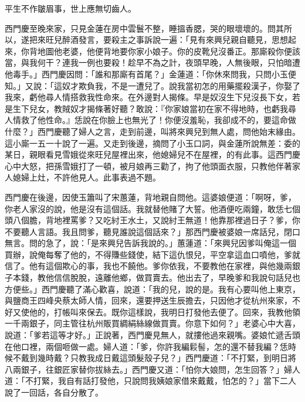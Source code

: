 平生不作皺眉事，世上應無切齒人。

西門慶至晚來家，只見金蓮在房中雲鬟不整，睡搵香腮，哭的眼壞壞的。問其所以，遂把來旺兒醉酒發言，要殺主之事訴說一遍：「見有來興兒親自聽見，思想起來，你背地圖他老婆，他便背地要你家小娘子。你的皮靴兒沒番正。那廝殺你便該當，與我何干？連我一例也要殺！趁早不為之計，夜頭早晚，人無後眼，只怕暗遭他毒手。」西門慶因問：「誰和那廝有首尾？」金蓮道：「你休來問我，只問小玉便知。」又說：「這奴才欺負我，不是一遭兒了。說我當初怎的用藥擺殺漢子，你娶了我來，虧他尋人情搭救我性命來。在外邊對人揭條。早是奴沒生下兒沒長下女，若是生下兒女，教賊奴才揭條著好聽？敢說：『你家娘當初在家不得地時，也虧我尋人情救了他性命。』恁說在你臉上也無光了！你便沒羞恥，我卻成不的，要這命做什麼？」西門慶聽了婦人之言，走到前邊，叫將來興兒到無人處，問他始末緣由。這小廝一五一十說了一遍。又走到後邊，摘問了小玉口詞，與金蓮所說無差：委的某日，親眼看見雪娥從來旺兒屋裡出來，他媳婦兒不在屋裡，的有此事。這西門慶心中大怒，把孫雪娥打了一頓，被月娘再三勸了，拘了他頭面衣服，只教他伴著家人媳婦上灶，不許他見人。此事表過不題。

西門慶在後邊，因使玉簫叫了宋蕙蓮，背地親自問他。這婆娘便道：「啊呀，爹，你老人家沒的說，他是沒有這個話。我就替他賭了大誓。他酒便吃兩鐘，敢恁七個頭八個膽，背地裡罵爹？又吃紂王水土，又說紂王無道！他靠那裡過日子？爹，你不要聽人言語。我且問爹，聽見誰說這個話來？」那西門慶被婆娘一席話兒，閉口無言。問的急了，說：「是來興兒告訴我說的。」蕙蓮道：「來興兒因爹叫俺這一個買辦，說俺每奪了他的，不得賺些錢使，結下這仇恨兒，平空拿這血口噴他，爹就信了。他有這個欺心的事，我也不饒他。爹你依我，不要教他在家裡，與他幾兩銀子本錢，教他信信脫脫，遠離他鄉，做買賣去。他出去了，早晚爹和我說句話兒也方便些。」西門慶聽了滿心歡喜，說道：「我的兒，說的是。我有心要叫他上東京，與鹽商王四峰央蔡太師人情，回來，還要押送生辰擔去，只因他才從杭州來家，不好又使他的，打帳叫來保去。既你這樣說，我明日打發他去便了。回來，我教他領一千兩銀子，同主管往杭州販買綢絹絲線做買賣。你意下如何？」老婆心中大喜，說道：「爹若這等才好。」正說著，西門慶見無人，就摟他過來親嘴。婆娘忙遞舌頭在他口裡，兩個咂做一處。婦人道：「爹，你許我編鬏髻，怎的還不替我編？恁時候不戴到幾時戴？只教我成日戴這頭髮殼子兒？」西門慶道：「不打緊，到明日將八兩銀子，往銀匠家替你拔絲去。」西門慶又道：「怕你大娘問，怎生回答？」婦人道：「不打緊，我自有話打發他，只說問我姨娘家借來戴戴，怕怎的？」當下二人說了一回話，各自分散了。

